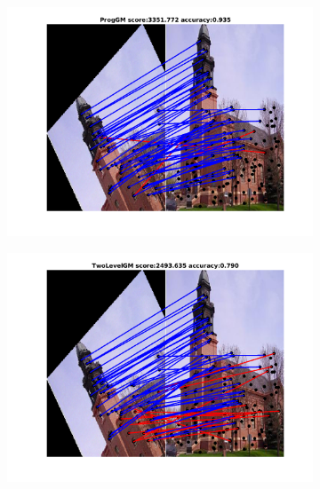 \documentclass[
	fontsize=12pt,
	paper=a4,
	twoside=false,
	numbers=noenddot,
	plainheadsepline,
	toc=listof,
	toc=bibliography
]{scrartcl}
\begin{document}
\begin{figure}[h]
	\begin{subfigure}[b]{0.33\textwidth}
		\centering
		\includegraphics[scale=0.25]{"fig_ver2608/RealImages/ImgTrafo/no_descr/using_cpd_afftrafo/fi_5_ProgGM"} 
	\end{subfigure}%
	\begin{subfigure}[b]{0.33\textwidth}
		\centering
		\includegraphics[scale=0.25]{"fig_ver2608/RealImages/ImgTrafo/no_descr/using_cpd_afftrafo/fi_5_TwoLevelGM"} 
	\end{subfigure} 
	\begin{subfigure}[b]{0.33\textwidth}
		\centering

\end{subfigure}
\end{figure}
\end{document}
